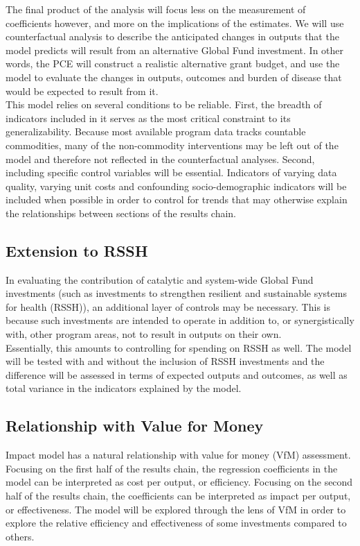 \documentclass[twocolumn]{bmcart}%
\begin{document}
The final product of the analysis will focus less on the measurement of coefficients however, and more on the implications of the estimates. We will use counterfactual analysis to describe the anticipated changes in outputs that the model predicts will result from an alternative Global Fund investment. In other words, the PCE will construct a realistic alternative grant budget, and use the model to evaluate the changes in outputs, outcomes and burden of disease that would be expected to result from it. \\

This model relies on several conditions to be reliable. First, the breadth of indicators included in it serves as the most critical constraint to its generalizability. Because most available program data tracks countable commodities, many of the non-commodity interventions may be left out of the model and therefore not reflected in the counterfactual analyses. Second, including specific control variables will be essential. Indicators of varying data quality, varying unit costs and confounding socio-demographic indicators will be included when possible in order to control for trends that may otherwise explain the relationships between sections of the results chain.

\subsection{Extension to RSSH}
In evaluating the contribution of catalytic and system-wide Global Fund investments (such as investments to strengthen resilient and sustainable systems for health (RSSH)), an additional layer of controls may be necessary. This is because such investments are intended to operate in addition to, or synergistically with, other program areas, not to result in outputs on their own. \\

Essentially, this amounts to controlling for spending on RSSH as well. The model will be tested with and without the inclusion of RSSH investments and the difference will be assessed in terms of expected outputs and outcomes, as well as total variance in the indicators explained by the model.

\subsection{Relationship with Value for Money} \label{vfm}
Impact model has a natural relationship with value for money (VfM) assessment. Focusing on the first half of the results chain, the regression coefficients in the model can be interpreted as cost per output, or efficiency. Focusing on the second half of the results chain, the coefficients can be interpreted as impact per output, or effectiveness. The model will be explored through the lens of VfM in order to explore the relative efficiency and effectiveness of some investments compared to others. \\
\end{document}
